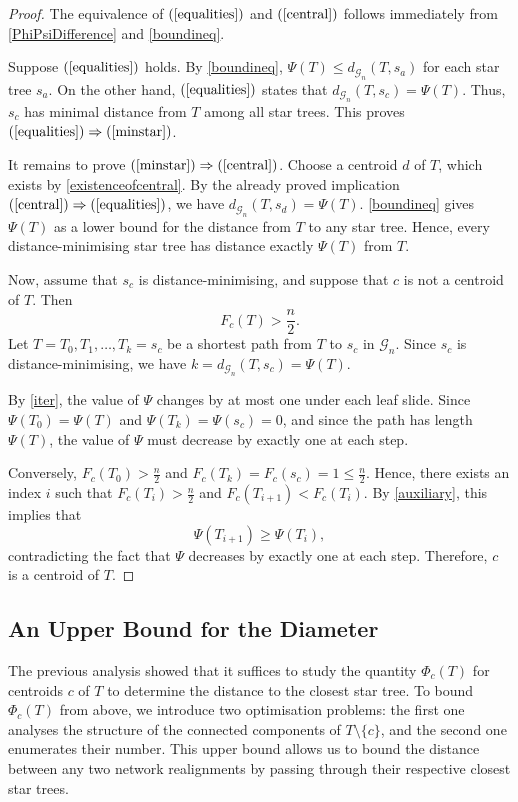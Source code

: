 \documentclass[reqno,dvipsnames]{amsart}
\theoremstyle{plain}
\numberwithin{equation}{section}
\theoremstyle{definition}
\begin{document}
\begin{proof}
    The equivalence of $(\ref{equalities})$ and $(\ref{central})$ follows immediately from \autoref{PhiPsiDifference} and \autoref{boundineq}.

	Suppose $(\ref{equalities})$ holds. By \autoref{boundineq}, $\Psi(T)\leq d_{\mathcal{G}_n}(T,s_a)$ for each star tree $s_a$. On the other hand, $(\ref{equalities})$ states that $d_{\mathcal{G}_n}(T,s_c)=\Psi(T)$. Thus, $s_c$ has minimal distance from $T$ among all star trees. This proves $(\ref{equalities})\Rightarrow(\ref{minstar})$.

	It remains to prove $(\ref{minstar})\Rightarrow(\ref{central})$. Choose a centroid $d$ of $T$, which exists by \autoref{existenceofcentral}. By the already proved implication $(\ref{central})\Rightarrow(\ref{equalities})$, we have $d_{\mathcal{G}_n}(T,s_d)=\Psi(T)$. \autoref{boundineq} gives $\Psi(T)$ as a lower bound for the distance from $T$ to any star tree. Hence, every distance-minimising star tree has distance exactly $\Psi(T)$ from $T$.

	Now, assume that $s_c$ is distance-minimising, and suppose that $c$ is not a centroid of $T$. Then
	\[
	F_c(T)> \frac{n}{2}.
	\]
	Let	$T=T_0,T_1,\dots,T_k=s_c$ be a shortest path from $T$ to $s_c$ in $\mathcal{G}_n$. Since $s_c$ is distance-minimising, we have $k=d_{\mathcal{G}_n}(T,s_c)=\Psi(T)$.

	By \autoref{iter}, the value of $\Psi$ changes by at most one under each leaf slide. Since $\Psi(T_0)=\Psi(T)$ and $\Psi(T_k)=\Psi(s_c)=0$, and since	the path has length $\Psi(T)$, the value of $\Psi$ must decrease by exactly one	at each step.

	Conversely, $F_c(T_0)> \frac{n}{2}$ and $F_c(T_k)=F_c(s_c)=1\leq \frac{n}{2}$. Hence, there exists an index $i$ such that $F_c(T_i)> \frac n2$ and $F_c(T_{i+1})<F_c(T_i)$.
	By \autoref{auxiliary}, this implies that
	\[
	\Psi(T_{i+1})\geq\Psi(T_i),
	\]
	contradicting the fact that $\Psi$ decreases by exactly one at each step. Therefore, $c$ is a centroid of $T$. 
\end{proof}




\subsection{An Upper Bound for the Diameter}

The previous analysis showed that it suffices to study the quantity $\Phi_c(T)$ for centroids $c$ of $T$ to determine the distance to the closest star tree. To bound $\Phi_c(T)$ from above, we introduce two optimisation problems: the first one analyses the structure of the connected components of $T\setminus \{c\}$, and the second one enumerates their number. This upper bound allows us to bound the distance between any two network realignments by passing through their respective closest star trees.
\end{document}
